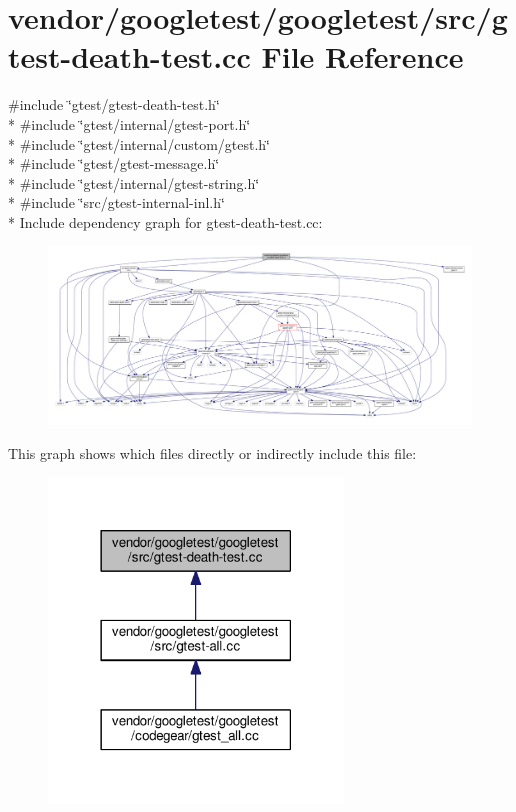 \hypertarget{gtest-death-test_8cc}{}\section{vendor/googletest/googletest/src/gtest-\/death-\/test.cc File Reference}
\label{gtest-death-test_8cc}
{\ttfamily \#include \char`\"{}gtest/gtest-\/death-\/test.\+h\char`\"{}}\\*
{\ttfamily \#include \char`\"{}gtest/internal/gtest-\/port.\+h\char`\"{}}\\*
{\ttfamily \#include \char`\"{}gtest/internal/custom/gtest.\+h\char`\"{}}\\*
{\ttfamily \#include \char`\"{}gtest/gtest-\/message.\+h\char`\"{}}\\*
{\ttfamily \#include \char`\"{}gtest/internal/gtest-\/string.\+h\char`\"{}}\\*
{\ttfamily \#include \char`\"{}src/gtest-\/internal-\/inl.\+h\char`\"{}}\\*
Include dependency graph for gtest-\/death-\/test.cc\+:
\nopagebreak
\begin{figure}[H]
\begin{center}
\leavevmode
\includegraphics[width=350pt]{gtest-death-test_8cc__incl}
\end{center}
\end{figure}
This graph shows which files directly or indirectly include this file\+:
\nopagebreak
\begin{figure}[H]
\begin{center}
\leavevmode
\includegraphics[width=222pt]{gtest-death-test_8cc__dep__incl}
\end{center}
\end{figure}
